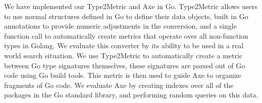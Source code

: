We have implemented our Type2Metric and Axe in Go.
Type2Metric allows users to use normal structures defined in Go to define their data objects, 
built in Go annotations to provide numeric adjustments in the conversion, 
and a single function call to automatically create metrics that operate over all non-function types in Golang.
We evaluate this converter by its ability to be used in a real world search situation.
We use Type2Metric to automatically create a metric between Go type signatures themselves,
these signatures are parsed out of Go code using Go build tools.
This metric is then used to guide Axe to organize fragments of Go code.
We evaluate Axe by creating indexes over all of the packages in the Go standard library,
and performing random queries on this data.